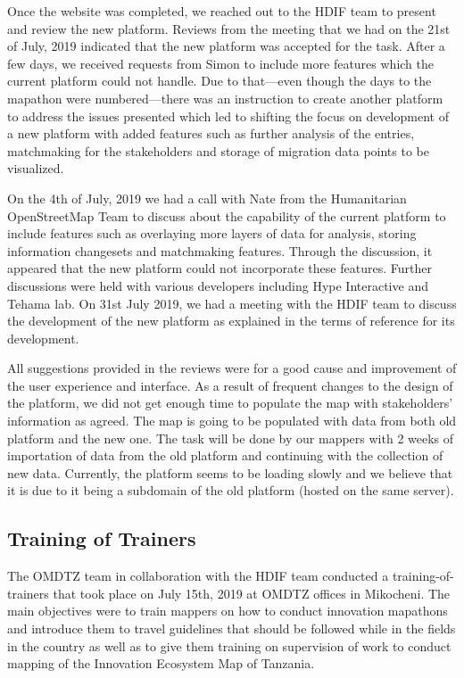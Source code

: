 \documentclass[a4paper,12pt,twoside]{article}
\begin{document}
Once the website was completed, we reached out to the HDIF team to present and review the new platform. Reviews from the meeting that we had on the 21st of July, 2019 indicated that the new platform was accepted for the task. After a few days, we received requests from Simon to include more features which the current platform could not handle. Due to that---even though the days to the mapathon were numbered---there was an instruction to create another platform to address the issues presented which led to shifting the focus on development of a new platform with added features such as further analysis of the entries, matchmaking for the stakeholders and storage of migration data points to be visualized.

On the 4th of July, 2019 we had a call with Nate from the Humanitarian OpenStreetMap Team to discuss about the capability of the current platform to include features such as overlaying more layers of data for analysis, storing information changesets and matchmaking features. Through the discussion, it appeared that the new platform could not incorporate these features. Further discussions were held with various developers including Hype Interactive and Tehama lab. On 31st July 2019, we had a meeting with the HDIF team to discuss the development of the new platform as explained in the terms of reference for its development.


All suggestions provided in the reviews were for a good cause and improvement of the user experience and interface. As a result of frequent changes to the design of the platform, we did not get enough time to populate the map with stakeholders’ information as agreed. The map is going to be populated with data from both old platform and the new one. The task will be done by our mappers with 2 weeks of importation of data from the old platform and continuing with the collection of new data. Currently, the platform seems to be loading slowly and we believe that it is due to it being a subdomain of the old platform (hosted on the same server).

\subsection{Training of Trainers}
The OMDTZ team in collaboration with the HDIF team conducted a training-of-trainers that took place on July 15th, 2019 at OMDTZ offices in Mikocheni. The main objectives were to train mappers on how to conduct innovation mapathons and introduce them to travel guidelines that should be followed while in the fields in the country as well as to give them training on supervision of work to conduct mapping of the Innovation Ecosystem Map of Tanzania.
\end{document}

